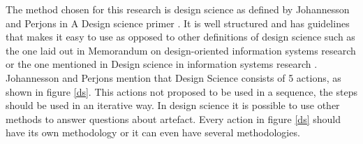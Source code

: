 The method chosen for this research is design science as defined by Johannesson and Perjons in A Design science primer \cite{johannesson2012design}. It is well structured and has guidelines that makes it easy to use as opposed to other definitions of design science such as the one laid out in Memorandum on design-oriented information systems research \cite{osterle2010memorandum} or the one mentioned in Design science in information systems research \cite{hevner2004design}. Johannesson and Perjons mention that Design Science consists of 5 actions, as shown in figure \ref{ds}. This actions not proposed to be used in a sequence, the steps should be used in an iterative way. In design science it is possible to use other methods to answer questions about artefact. Every action in figure \ref{ds} should have its own methodology or it can even have several methodologies.







